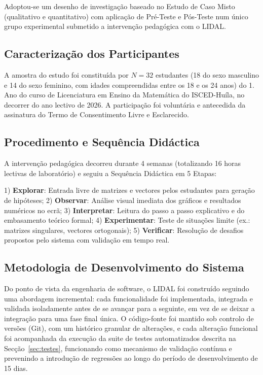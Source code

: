 \documentclass[conference]{IEEEtran}
\begin{document}
Adoptou-se um desenho de investigação baseado no Estudo de Caso Misto (qualitativo e quantitativo) com aplicação de Pré-Teste e Pós-Teste num único grupo experimental submetido a intervenção pedagógica com o LIDAL.

\subsection{Caracterização dos Participantes}

A amostra do estudo foi constituída por $N = 32$ estudantes (18 do sexo masculino e 14 do sexo feminino, com idades compreendidas entre os 18 e os 24 anos) do 1.\textordmasculine{} Ano do curso de Licenciatura em Ensino da Matemática do ISCED-Huíla, no decorrer do ano lectivo de 2026. A participação foi voluntária e antecedida da assinatura do Termo de Consentimento Livre e Esclarecido.

\subsection{Procedimento e Sequência Didáctica}
\label{sec:seq-didactica}

A intervenção pedagógica decorreu durante 4 semanas (totalizando 16 horas lectivas de laboratório) e seguiu a Sequência Didáctica em 5 Etapas:

1) \textbf{Explorar}: Entrada livre de matrizes e vectores pelos estudantes para geração de hipóteses; 2) \textbf{Observar}: Análise visual imediata dos gráficos e resultados numéricos no ecrã; 3) \textbf{Interpretar}: Leitura do passo a passo explicativo e do embasamento teórico formal; 4) \textbf{Experimentar}: Teste de situações limite (ex.: matrizes singulares, vectores ortogonais); 5) \textbf{Verificar}: Resolução de desafios propostos pelo sistema com validação em tempo real.

\subsection{Metodologia de Desenvolvimento do Sistema}

Do ponto de vista da engenharia de software, o LIDAL foi construído seguindo uma abordagem incremental: cada funcionalidade foi implementada, integrada e validada isoladamente antes de se avançar para a seguinte, em vez de se deixar a integração para uma fase final única. O código-fonte foi mantido sob controlo de versões (Git), com um histórico granular de alterações, e cada alteração funcional foi acompanhada da execução da suite de testes automatizados descrita na Secção~\ref{sec:testes}, funcionando como mecanismo de validação contínua e prevenindo a introdução de regressões ao longo do período de desenvolvimento de 15 dias.
\end{document}
